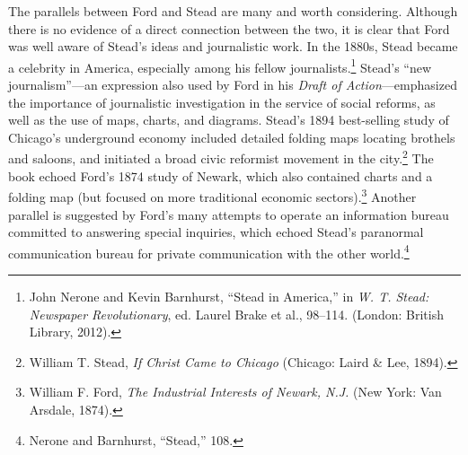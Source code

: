 \documentclass[openany,nobib]{tufte-book}
\begin{document}
The parallels between Ford and Stead are many and worth considering.
Although there is no evidence of a direct connection between the two, it
is clear that Ford was well aware of Stead's ideas and journalistic
work. In the 1880s, Stead became a celebrity in America, especially
among his fellow journalists.\footnote{John Nerone and Kevin Barnhurst,
  ``Stead in America,'' in \emph{W. T. Stead: Newspaper Revolutionary},
  ed. Laurel Brake et al., 98--114. (London: British Library, 2012).}
Stead's ``new journalism''---an expression also used by Ford in his
\emph{Draft of Action}---emphasized the importance of journalistic
investigation in the service of social reforms, as well as the use of
maps, charts, and diagrams. Stead's 1894 best-selling study of Chicago's
underground economy included detailed folding maps locating brothels and
saloons, and initiated a broad civic reformist movement in the
city.\footnote{William T. Stead, \emph{If Christ Came to Chicago}
  (Chicago: Laird \& Lee, 1894).} The book echoed Ford's 1874 study of
Newark, which also contained charts and a folding map (but focused on
more traditional economic sectors).\footnote{William F. Ford, \emph{The
  Industrial Interests of Newark, N.J.} (New York: Van Arsdale, 1874).}
Another parallel is suggested by Ford's many attempts to operate an
information bureau committed to answering special inquiries, which
echoed Stead's paranormal communication bureau for private communication
with the other world.\footnote{Nerone and Barnhurst, ``Stead,'' 108.}
\end{document}
